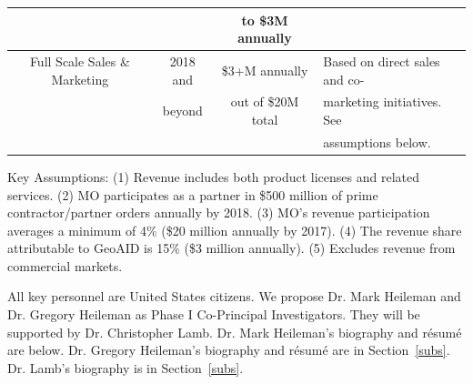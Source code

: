 \documentclass{sbir}
\begin{document}
\begin{table}
\begin{center}
\begin{tabular}{|cccl|}
   								&						& 	to \$3M annually		&							\\ \hline
   Full Scale Sales \& Marketing			&		2018 and 			& 	\$3+M annually			& Based on direct sales and co- \\
   								& 		beyond			&	out of \$20M total		& marketing initiatives. See          \\
								&						&						& assumptions below.	\\ \hline
 \end{tabular}
\end{center}
\vspace{-6pt}
{\small Key Assumptions: (1) Revenue includes both product licenses and related services. (2) MO participates as a partner in \$500 million of prime contractor/partner orders annually by 2018. (3) MO's revenue participation averages a minimum of 4\% (\$20 million annually by 2017). (4) The revenue share attributable to GeoAID is 15\% (\$3 million annually). (5) Excludes revenue from commercial markets.}
\end{table}

All key personnel are United States citizens. We propose Dr. Mark Heileman and Dr. Gregory Heileman as Phase I Co-Principal Investigators. They will be supported by Dr. Christopher Lamb. Dr. Mark Heileman's biography and r\'esum\'e are below. Dr. Gregory Heileman's biography and r\'esum\'e are in Section~\ref{subs}. Dr. Lamb's biography is in Section~\ref{subs}.
\vspace{-0.1in}
\begin{center}
\end{center}
\end{document}
